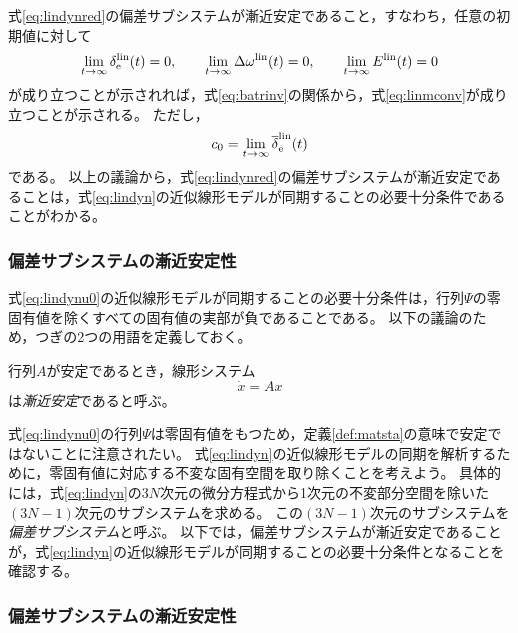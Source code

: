 \documentclass[tombow,dvipdfmx]{corona-a5}
\begin{document}
式\ref{eq:lindynred}の偏差サブシステムが漸近安定であること，すなわち，任意の初期値に対して
\[
\lim_{t\rightarrow \infty}\delta^{\rm lin}_{\rm e}(t)= 0 ,\qquad
\lim_{t\rightarrow \infty}\Delta \omega^{\rm lin}(t)=0 ,\qquad
\lim_{t\rightarrow \infty} E^{\rm lin}(t)=0
\]
が成り立つことが示されれば，式\ref{eq:batrinv}の関係から，式\ref{eq:linmconv}が成り立つことが示される。
ただし，
\[
c_0=
\lim_{t\rightarrow \infty} \overline{\delta}^{\rm lin}_{\rm e}(t) 
\]
である。
以上の議論から，式\ref{eq:lindynred}の偏差サブシステムが漸近安定であることは，式\ref{eq:lindyn}の近似線形モデルが同期することの必要十分条件であることがわかる。



\subsubsection{偏差サブシステムの漸近安定性}

式\ref{eq:lindynu0}の近似線形モデルが同期することの必要十分条件は，行列$\Psi$の零固有値を除くすべての固有値の実部が負であることである。
以下の議論のため，つぎの2つの用語を定義しておく。



\begin{定義}[線形システムの漸近安定性]
\label{def:difsta}
行列$A$が安定であるとき，線形システム
\[
\dot{x}=Ax
\]
は\emph{漸近安定}であると呼ぶ。
\end{定義}

式\ref{eq:lindynu0}の行列$\Psi$は零固有値をもつため，定義\ref{def:matsta}の意味で安定ではないことに注意されたい。
式\ref{eq:lindyn}の近似線形モデルの同期を解析するために，零固有値に対応する不変な固有空間を取り除くことを考えよう。
具体的には，式\ref{eq:lindyn}の$3N$次元の微分方程式から1次元の不変部分空間を除いた$(3N-1)$次元のサブシステムを求める。
この$(3N-1)$次元のサブシステムを\emph{偏差サブシステム}と呼ぶ。
以下では，偏差サブシステムが漸近安定であることが，式\ref{eq:lindyn}の近似線形モデルが同期することの必要十分条件となることを確認する。



\subsubsection{偏差サブシステムの漸近安定性}
\end{document}
